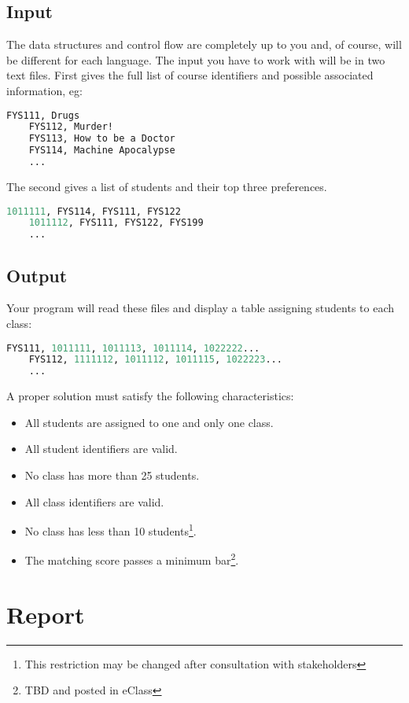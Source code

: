 \documentclass[12pt,info]{asg}
\begin{document}
\subsection*{Input}

The data structures and control flow are completely up to you and, of course, will be different for each language. The input you have to work with will be in two text files. First gives the full list of course identifiers and possible associated information, eg:
\begin{lstlisting}[language=Lisp]
	FYS111, Drugs
	FYS112, Murder!
	FYS113, How to be a Doctor
	FYS114, Machine Apocalypse
	...
\end{lstlisting}
The second gives a list of students and their top three preferences.
\begin{lstlisting}[language=Lisp]
	1011111, FYS114, FYS111, FYS122
	1011112, FYS111, FYS122, FYS199
	...
\end{lstlisting}

\subsection*{Output}
Your program will read these files and display a table assigning students to each class:
\begin{lstlisting}[language=Lisp]
	FYS111, 1011111, 1011113, 1011114, 1022222...
	FYS112, 1111112, 1011112, 1011115, 1022223...
	...
\end{lstlisting}

A proper solution must satisfy the following characteristics:
\begin{itemize}
\item All students are assigned to one and only one class.
\item All student identifiers are valid.
\item No class has more than 25 students.
\item All class identifiers are valid.
\item No class has less than 10 students\footnote{This restriction may be changed after consultation with stakeholders}.
\item The matching score passes a minimum bar\footnote{TBD and posted in eClass}.
\end{itemize}

\section*{Report}
\end{document}
